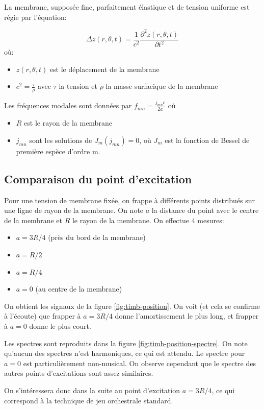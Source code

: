 \documentclass[atiam, article]{rapport} %
\begin{document}
La membrane, supposée fine, parfaitement élastique et de tension uniforme est régie par l'équation:

$$\Delta z(r,\theta, t) = \frac{1}{c^2} \frac{\partial^2 z(r,\theta,t)}{\partial t^2}$$ où:
\begin{itemize}
  \item $z(r,\theta, t)$ est le déplacement de la membrane
  \item $c^2 = \frac{\tau}{\rho}$ avec $\tau$ la tension et $\rho$ la masse surfacique de la membrane
\end{itemize}

Les fréquences modales sont données par $f_{mn} = \frac{j_{mn} c}{2a}$ où
\begin{itemize}
  \item $R$ est le rayon de la membrane
  \item $j_{mn}$ sont les solutions de $J_m(j_{mn}) = 0$, où $J_m$ est la fonction de Bessel de première espèce d'ordre m.
\end{itemize}


\subsection{Comparaison du point d'excitation}

Pour une tension de membrane fixée, on frappe à différents points distribués sur une ligne de rayon de la membrane. On note $a$ la distance du point avec le centre de la membrane et $R$ le rayon de la membrane. On effectue 4 mesures:
\begin{itemize}
  \item $a=3R/4$ (près du bord de la membrane)
  \item $a=R/2$
  \item $a=R/4$
  \item $a=0$ (au centre de la membrane)
\end{itemize}

On obtient les signaux de la figure \ref{fig:timb-position}. On voit (et cela se confirme à l'écoute) que frapper à $a=3R/4$ donne l'amortissement le plus long, et frapper à $a=0$ donne le plus court.

Les spectres sont reproduits dans la figure \ref{fig:timb-position-spectre}. On note qu'aucun des spectres n'est harmoniques, ce qui est attendu. Le spectre pour $a=0$ est particulièrement non-musical. On observe cependant que le spectre des autres points d'excitations sont assez similaires.

On s'intéressera donc dans la suite au point d'excitation $a=3R/4$, ce qui correspond à la technique de jeu orchestrale standard.
\end{document}
